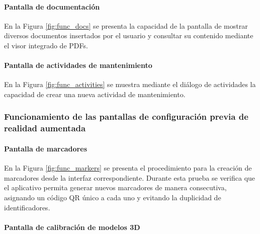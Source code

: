                 

            \paragraph{Pantalla de documentación}

                En la Figura \ref{fig:func_docs} se presenta la capacidad de la pantalla de mostrar diversos documentos insertados por el usuario y consultar su contenido mediante el visor integrado de PDFs.

                

            \paragraph{Pantalla de actividades de mantenimiento}

                En la Figura \ref{fig:func_activities} se muestra mediante el diálogo de actividades la capacidad de crear una nueva actividad de mantenimiento.

                

        \subsubsection{Funcionamiento de las pantallas de configuración previa de realidad aumentada}

            \paragraph{Pantalla de marcadores}

                En la Figura \ref{fig:func_markers} se presenta el procedimiento para la creación de marcadores desde la interfaz correspondiente. Durante esta prueba se verifica que el aplicativo permita generar nuevos marcadores de manera consecutiva, asignando un código QR único a cada uno y evitando la duplicidad de identificadores.

                                

            \paragraph{Pantalla de calibración de modelos 3D}


